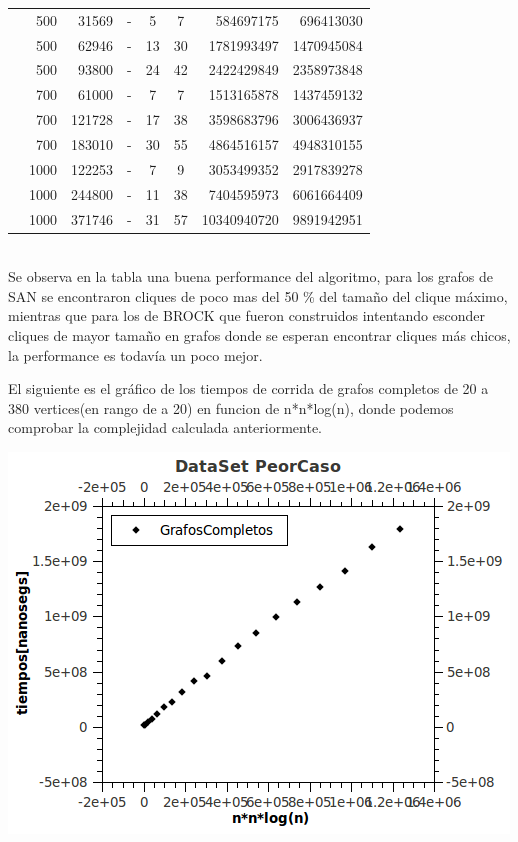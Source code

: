 \begin{tabular}{|l|r|r|c|c|c|r|r|}
& 500& 31569& -& 5& 7&584697175 & 696413030\\
& 500& 62946& -& 13& 30&1781993497 & 1470945084\\
& 500& 93800& -& 24& 42&2422429849 &2358973848 \\
& 700& 61000& -& 7& 7&1513165878 & 1437459132\\
& 700& 121728& -& 17& 38&3598683796 & 3006436937\\
& 700& 183010& -& 30& 55&4864516157 & 4948310155 \\ 
& 1000& 122253& -& 7& 9&3053499352 & 2917839278\\
& 1000& 244800& -& 11& 38&7404595973 & 6061664409\\
& 1000& 371746& -& 31& 57&10340940720 & 9891942951\\
\hline 
\end{tabular} \\

Se observa en la tabla una buena performance del algoritmo, para los grafos de SAN se encontraron cliques de poco mas del 50 \% del tamaño del clique máximo, mientras que para los de BROCK que fueron construidos intentando esconder cliques de mayor tamaño en grafos donde se esperan encontrar cliques más chicos, la performance es todavía un poco mejor. 
 
El siguiente es el gráfico de los tiempos de corrida de grafos completos de 20 a 380 vertices(en rango de a 20) en funcion de n*n*log(n), donde podemos comprobar la complejidad calculada anteriormente.
 
\includegraphics[scale=0.8]{HC/PeorCaso.png}

